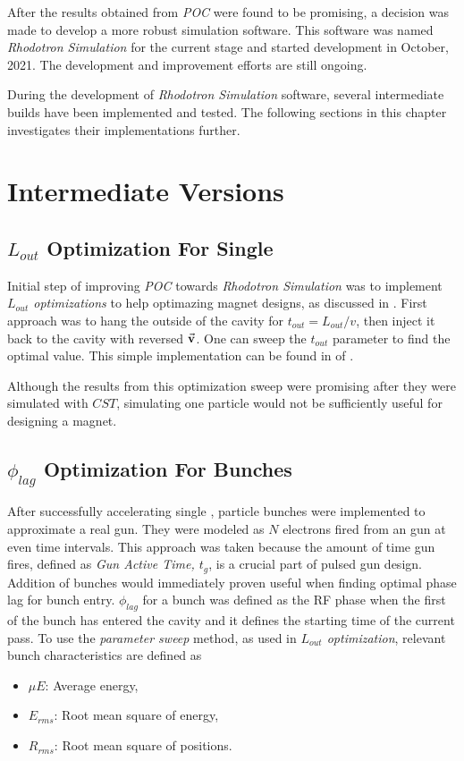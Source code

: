 \documentclass[a4paper,oneside,12pt]{report}
\numberwithin{equation}{chapter}
\begin{document}
After the results obtained from \textit{POC} were found to be promising, a decision was made to develop a more robust simulation software. This software was named \textit{Rhodotron Simulation} for the current stage and started development in October, 2021.
The development and improvement efforts are still ongoing. 

During the development of \textit{Rhodotron Simulation} software, several intermediate builds have been implemented and tested. The following sections in this chapter investigates their implementations further.



\section{Intermediate Versions}

\subsection{$L_{out}$ Optimization For Single \e} \label{sec:lout_sweep}
Initial step of improving \textit{POC} towards \textit{Rhodotron Simulation} was to implement \textit{$L_{out}$ optimizations} to help optimazing magnet designs, as discussed in .
First approach was to hang the \e outside of the cavity for $t_{out} = L_{out}/v$, then inject it back to the cavity with reversed $\vec{\textbf{v}}$. One can sweep the $t_{out}$ parameter to find the optimal value.
This simple implementation can be found in  of .

Although the results from this optimization sweep were promising after they were simulated with $CST$, simulating one particle would not be sufficiently useful for designing a magnet.

\subsection{$\phi_{lag}$ Optimization For Bunches} \label{sec:philag_sweep}
After successfully accelerating single \e, particle bunches were implemented to approximate a real \e gun. 
They were modeled as $N$ electrons fired from an \e gun at even time intervals. This approach was taken because the amount of time gun fires, defined as \textit{Gun Active Time, $t_g$}, is a crucial part of pulsed \e gun design.
\clearpage
Addition of bunches would immediately proven useful when finding optimal phase lag for bunch entry.
$\phi_{lag}$ for a bunch was defined as the RF phase when the first \e of the bunch has entered the cavity and it defines the starting time of the current pass.
To use the \textit{parameter sweep} method, as used in \textit{$L_{out}$ optimization}, relevant bunch characteristics are defined as
\vspace{-10pt}\begin{itemize}
    \item $\mu E$: Average energy,
    \item $E_{rms}$: Root mean square of energy,
    \item $R_{rms}$: Root mean square of \e positions.
\end{itemize}
\end{document}
